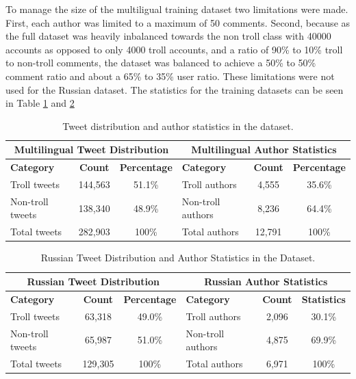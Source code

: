 \documentclass[twoside]{ctuthesis}
\theoremstyle{plain}
\theoremstyle{definition}
\theoremstyle{note}
\begin{document}
To manage the size of the multiligual training dataset two limitations were made. First, each author was limited to a maximum of 50 comments. Second, because as the full dataset was heavily inbalanced towards the non troll class with 40000 accounts as opposed to only 4000 troll accounts, and a ratio of 90\% to 10\% troll to non-troll comments, the dataset was balanced to achieve a 50\% to 50\% comment ratio and about a 65\% to 35\% user ratio. These limitations were not used for the Russian dataset. The statistics for the training datasets can be seen in Table \ref{tab:mult_statistics} and \ref{tab:russian_statistics}\par

\begin{table}[ht]
    \centering
    \caption{Tweet distribution and author statistics in the dataset.}
    \label{tab:mult_statistics}
    \begin{tabular}{lcc|lcc}
        \toprule
        \multicolumn{3}{c|}{\textbf{Multilingual Tweet Distribution}} & \multicolumn{3}{c}{\textbf{Multilingual Author Statistics}} \\
        \midrule
        \textbf{Category} & \textbf{Count} & \textbf{Percentage} & \textbf{Category} & \textbf{Count} & \textbf{Percentage} \\
        \midrule
        Troll tweets     & 144,563 & 51.1\% & Troll authors     & 4,555 & 35.6\% \\
        Non-troll tweets & 138,340 & 48.9\% & Non-troll authors & 8,236 & 64.4\% \\
        \midrule
        Total tweets     & 282,903 & 100\% & Total authors & 12,791 & 100\% \\
        \bottomrule
    \end{tabular}
\end{table}


\begin{table}[ht]
    \centering
    \caption{Russian Tweet Distribution and Author Statistics in the Dataset.}
    \label{tab:russian_statistics}
    \begin{tabular}{lcc|lcc}
        \toprule
        \multicolumn{3}{c|}{\textbf{Russian Tweet Distribution}} & \multicolumn{3}{c}{\textbf{Russian Author Statistics}} \\
        \midrule
        \textbf{Category} & \textbf{Count} & \textbf{Percentage} & \textbf{Category} & \textbf{Count} & \textbf{Statistics} \\
        \midrule
        Troll tweets     & 63,318 & 49.0\% & Troll authors     & 2,096 & 30.1\% \\
        Non-troll tweets & 65,987 & 51.0\% & Non-troll authors & 4,875 & 69.9\% \\
        \midrule
        Total tweets     & 129,305 & 100\% & Total authors & 6,971 & 100\% \\
        \bottomrule
    \end{tabular}
\end{table}
\end{document}
